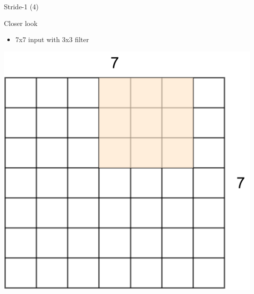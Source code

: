 \documentclass[default, aspectratio=169]{beamer}
\begin{document}
	\begin{frame}{Stride-1 (4)}
		\vspace{0.5cm}
		
		\normalsize Closer look
		\begin{itemize}
			\item 7x7 input with 3x3 filter
		\end{itemize}
		
		\centering
		\includegraphics[keepaspectratio, scale=0.25]{pic/Stride4.png}
	\end{frame}
\end{document}
